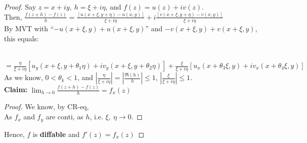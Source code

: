 \documentclass[12pt,a4paper]{article}
\begin{document}
\begin{proof}
  Say $z = x + iy,\ h = \xi + i \eta$, and $f(z) = u(z) + iv(z)$. \\

  \noindent Then, $\frac{f(z + h) - f(z)}{h} = \frac{[u(x + \xi, y + \eta) - u(x, y)]}{\xi + i \eta} + i \frac{[v(x + \xi, y + \eta) - v(x, y)]}{\xi + i \eta}$ \\

  \noindent By MVT with ``$-u(x + \xi, y) + u(x + \xi, y)$'' and $-v(x + \xi, y) + v(x + \xi, y)$, this equals:

  \noindent {} \\

  $= \frac{\eta}{\xi + i\eta}[u_y(x + \xi, y + \theta_1 \eta) + iv_y(x + \xi, y + \theta_2 \eta)] + \frac{\xi}{\xi + i\eta}[u_x(x + \theta_3\xi, y) + iv_x(x + \theta_4\xi, y)]$ \\

  \noindent As we know, $0 < \theta_k < 1$, and $|\frac{\eta}{\xi + i\eta}| = |\frac{\Re(h)}{h}| \leq 1$, $|\frac{\xi}{\xi + i \eta}| \leq 1$. \\

  \noindent \textbf{Claim:} $\lim_{h \to 0} \frac{f(z + h) - f(z)}{h} = f_x(z)$ \\

  \begin{proof}
    We know, by CR-eq,  \\

    \noindent As $f_x$ and $f_y$ are conti, \lghl{$\frac{f(z + h) - f(z)}{h} - f_x(z) = \frac{\eta}{\xi + i\eta}[(u_y(x + \xi, y + \theta_1 \eta) - u_y(x, y)) + i(v_y(x + \xi, y + \theta_2 \eta)$} \lghl{$- v_y(x, y))] + \frac{\xi}{\xi + i\eta}[(u_x(x + \theta_3\xi, y) - u_x(x, y)) + i(v_x(x + \theta_4\xi, y) - v_x(x, y))] \to 0$} as $h$, i.e. $\xi,\ \eta \to 0$.
  \end{proof}

  \noindent Hence, $f$ is \textbf{diffable} and $\boxed{f'(z) = f_x(z)}$
\end{proof}

\vspace{1.0em}

\end{document}
